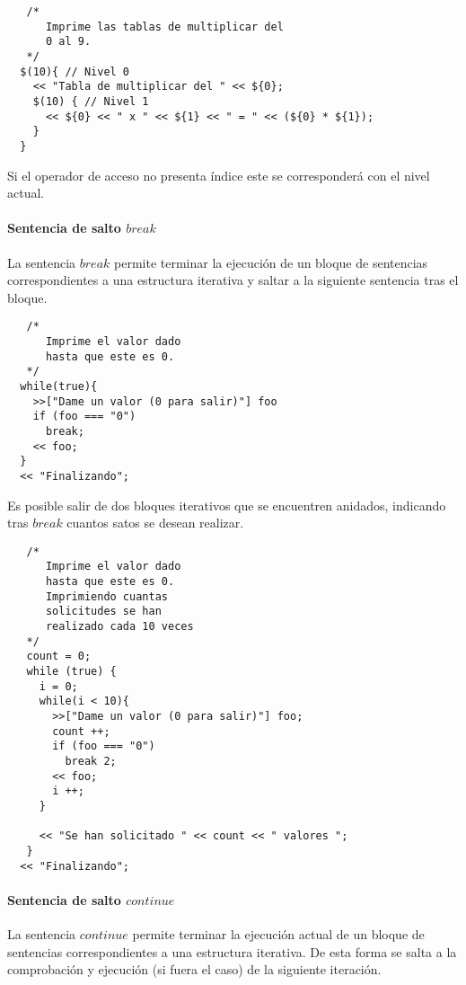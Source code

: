 \begin{lstlisting}
   /*
      Imprime las tablas de multiplicar del 
      0 al 9.
   */
  $(10){ // Nivel 0
    << "Tabla de multiplicar del " << ${0};
    $(10) { // Nivel 1
      << ${0} << " x " << ${1} << " = " << (${0} * ${1}); 
    }
  }
\end{lstlisting}

Si el operador de acceso no presenta índice este se corresponderá con el nivel actual.



\paragraph{Sentencia de salto $break$} \label{sec:stmt_break}
La sentencia $break$ permite terminar la ejecución de un bloque de sentencias correspondientes a una estructura iterativa y saltar a la siguiente sentencia tras el bloque. \\

\begin{lstlisting}
   /*
      Imprime el valor dado
      hasta que este es 0.
   */
  while(true){
    >>["Dame un valor (0 para salir)"] foo
    if (foo === "0")
      break;
    << foo;
  }
  << "Finalizando";
\end{lstlisting}

Es posible salir de dos bloques iterativos que se encuentren anidados, indicando tras $break$ cuantos satos se desean realizar. \\

\begin{lstlisting}
   /*
      Imprime el valor dado
      hasta que este es 0.
      Imprimiendo cuantas 
      solicitudes se han 
      realizado cada 10 veces
   */
   count = 0;
   while (true) {
     i = 0;
     while(i < 10){
       >>["Dame un valor (0 para salir)"] foo;
       count ++;
       if (foo === "0")
         break 2;
       << foo;
       i ++;
     }
     
     << "Se han solicitado " << count << " valores ";
   }
  << "Finalizando";
\end{lstlisting} 

\paragraph{Sentencia de salto $continue$} \label{sec:stmt_continue}

La sentencia $continue$ permite terminar la ejecución actual de un bloque de sentencias correspondientes a una estructura iterativa. De esta forma se salta a la comprobación y 
ejecución (si fuera el caso) de la siguiente iteración. \\

